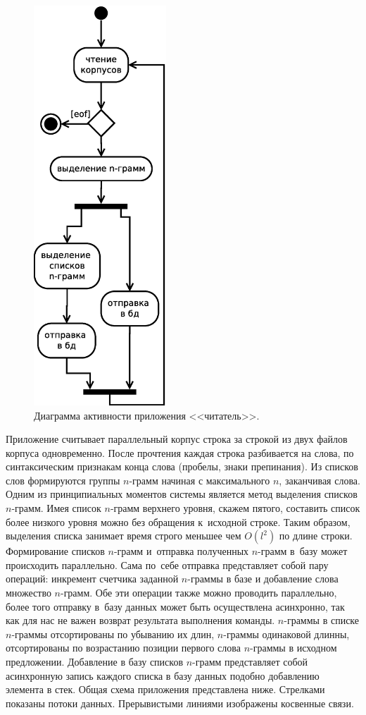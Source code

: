\begin{figure}[H]
\begin{center}
	\includegraphics[height=15.0cm]{./vec/arch-reader.eps}
\end{center}
\caption{Диаграмма активности приложения <<читатель>>.}
\end{figure}

Приложение считывает параллельный корпус строка за строкой из двух файлов корпуса одновременно.
После прочтения каждая строка разбивается на слова, по синтаксическим признакам конца слова (пробелы, знаки препинания).
Из списков слов формируются группы $n$-грамм начиная с максимального $n$, 
заканчивая слова.
Одним из принципиальных моментов системы является метод выделения списков $n$-грамм.
Имея список $n$-грамм верхнего уровня, скажем пятого, составить список более низкого уровня 
можно без обращения к~исходной строке. Таким образом, выделения списка занимает время строго 
меньшее чем $O(l^2)$ по длине строки.
Формирование списков  $n$-грамм  и~отправка полученных $n$-грамм в~базу может происходить параллельно.
Сама по~себе отправка представляет собой пару операций: инкремент счетчика заданной $n$-граммы в базе 
и добавление слова множество $n$-грамм.
Обе эти операции также можно проводить параллельно, более того отправку 
в~базу данных может быть осуществлена асинхронно, так как для нас не важен возврат 
результата выполнения команды.
$n$-граммы в списке $n$-граммы отсортированы по убыванию их длин, $n$-граммы одинаковой длинны, 
отсортированы по возрастанию позиции первого слова $n$-граммы в исходном предложении.
Добавление в базу списков $n$-грамм представляет 
собой асинхронную запись каждого списка в базу данных подобно добавлению 
элемента в стек.
Общая схема приложения представлена ниже.
Стрелками показаны потоки данных.
Прерывистыми линиями изображены косвенные связи.

